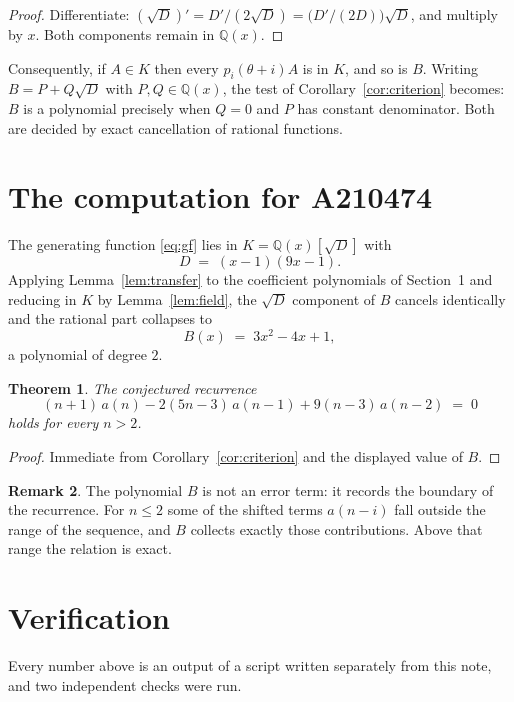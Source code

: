 \documentclass[11pt,a4paper]{article}
\theoremstyle{plain}
\newtheorem{theorem}{Theorem}
\theoremstyle{definition}
\newtheorem{remark}[theorem]{Remark}
\begin{document}
\begin{proof}
Differentiate: $(\sqrt{D})'=D'/(2\sqrt{D})=\bigl(D'/(2D)\bigr)\sqrt{D}$, and multiply by
$x$. Both components remain in $\mathbb{Q}(x)$.
\end{proof}

Consequently, if $A\in K$ then every $p_{i}(\theta+i)A$ is in $K$, and so is $B$. Writing
$B=P+Q\sqrt{D}$ with $P,Q\in\mathbb{Q}(x)$, the test of Corollary~\ref{cor:criterion}
becomes: $B$ is a polynomial precisely when $Q=0$ and $P$ has constant denominator. Both
are decided by exact cancellation of rational functions.

\section{The computation for A210474}

The generating function \eqref{eq:gf} lies in $K=\mathbb{Q}(x)[\sqrt{D}]$ with
\[
D \;=\; \left(x - 1\right) \left(9 x - 1\right) .
\]
Applying Lemma~\ref{lem:transfer} to the coefficient polynomials of Section~1 and reducing
in $K$ by Lemma~\ref{lem:field}, the $\sqrt{D}$ component of $B$ cancels identically and
the rational part collapses to
\[
B(x)\;=\;3 x^{2} - 4 x + 1 ,
\]
a polynomial of degree $2$.

\begin{theorem}
The conjectured recurrence
\[
(n + 1)\,a(n) -  2 \left(5 n - 3\right)\,a(n-1) + 9 \left(n - 3\right)\,a(n-2) \;=\;0
\]
holds for every $n>2$.
\end{theorem}

\begin{proof}
Immediate from Corollary~\ref{cor:criterion} and the displayed value of $B$.
\end{proof}

\begin{remark}
The polynomial $B$ is not an error term: it records the boundary of the recurrence. For
$n\le2$ some of the shifted terms $a(n-i)$ fall outside the range of the sequence,
and $B$ collects exactly those contributions. Above that range the relation is exact.
\end{remark}

\section{Verification}

Every number above is an output of a script written separately from this note, and two
independent checks were run.
\end{document}
